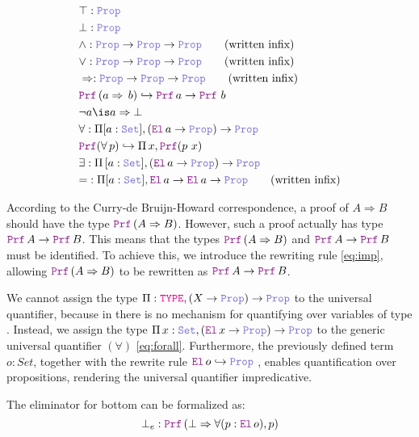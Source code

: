 \begin{definition}
\begin{align}
& \top : \prop \\
& \bot : \prop \\
& \land : \prop \ra \prop \ra \prop \qquad \text{(written inﬁx)} \\
& \lor : \prop \ra \prop \ra \prop \qquad \text{(written inﬁx)} \\
& \Rightarrow : \prop \ra \prop \ra \prop \qquad \text{(written inﬁx)} \\
&  \prf\,(a \Rightarrow\,b) \re \prf\, a \ra \prf\,\,b \label{eq:imp}\\
& \neg a \is a \Rightarrow \bot \\
& \forall : \Pi {[a: \set]}, (\el\, a \ra \prop) \ra \prop \label{eq:forall}\\
& \prf{}(\forall\,p) \re \Pi\, x, \prf{(p~x)}\\
& \exists : \Pi\, {[a: \set]}, (\el\, a \ra \prop) \ra \prop \\
& {=} : \Pi [a : \set], \el\, a \ra \el\, a \ra \prop \qquad \text{(written inﬁx)}
\end{align}
\end{definition}

According to the Curry-de Bruijn-Howard correspondence, a proof of $A \Rightarrow B$ should have the type $\prf\,(A \Rightarrow B)$.
However, such a proof actually has type $\prf\,A \ra \prf\,B$. This means that the types $\prf\,(A \Rightarrow B)$ and $\prf\,A \ra \prf\,B$ must be identiﬁed.
To achieve this, we introduce the rewriting rule \cref{eq:imp}, allowing $\prf\,(A \Rightarrow B)$ to be rewritten as $\prf\,A \ra \prf\,B$.

We cannot assign the type $\Pi : \type, (X \ra \prop) \ra \prop$ to the universal quantifier, because in \lpm{} there is no mechanism for quantifying over variables of type \type.
Instead, we assign the type $\Pi\,x:\set{},(\el\,x \ra \prop) \ra \prop$ to the generic universal quantiﬁer $(\forall)$ \cref{eq:forall}.
Furthermore, the previously defined term $o: Set$, together with the rewrite rule $\el\,o\index{o}  \hookrightarrow \prop$
, enables quantification over propositions, rendering the universal quantifier impredicative.

\begin{example}
The eliminator for bottom can be formalized as:
\[ \bot_e : \prf\,(\bot \Rightarrow \forall (p: \el\,o), p) \]
\end{example}

